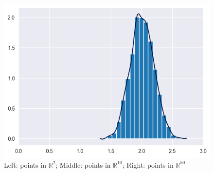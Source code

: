 \documentclass[smaller]{beamer}
\theoremstyle{example}
\begin{document}
\begin{frame}
\begin{figure}
\begin{minipage}{0.32\textwidth}
            \includegraphics[width=\textwidth]{../../Images/pairwise-distances-dim50.png}
        \end{minipage}
        \caption{Left: points in $\mathbb R^2$; Middle: points in $\mathbb R^{10}$; Right: points in $\mathbb R^{50}$}
    \end{figure}
\end{frame}
\end{document}

